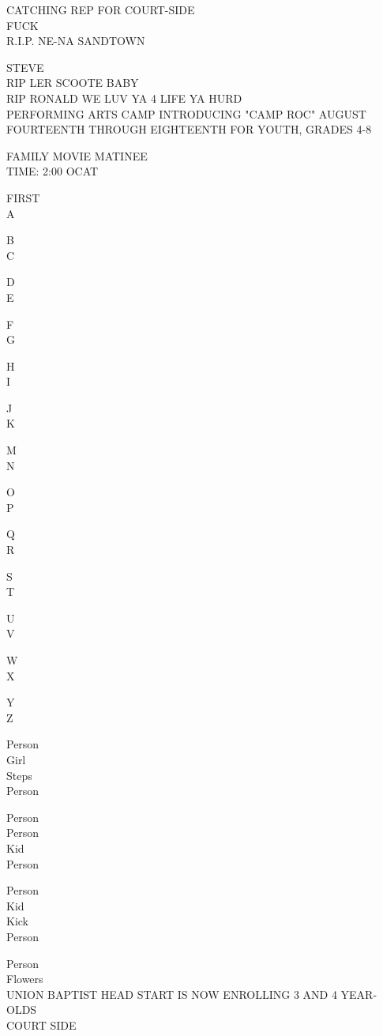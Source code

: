 \documentclass[10pt,letterpaper]{article}
\begin{document}
CATCHING REP FOR COURT{-}SIDE\\
FUCK\\
R.I.P. NE{-}NA SANDTOWN

STEVE\\
RIP LER SCOOTE BABY\\
RIP RONALD WE LUV YA 4 LIFE YA HURD\\
PERFORMING ARTS CAMP INTRODUCING "CAMP ROC" AUGUST FOURTEENTH THROUGH EIGHTEENTH FOR YOUTH, GRADES 4{-}8

FAMILY MOVIE MATINEE\\
TIME: 2:00 OCAT

FIRST\\
A

B\\
C

D\\
E

F\\
G

H\\
I

J\\
K

M\\
N

O\\
P

Q\\
R

S\\
T

U\\
V

W\\
X

Y\\
Z

Person\\
Girl\\
Steps\\
Person

Person\\
Person\\
Kid\\
Person

Person\\
Kid\\
Kick\\
Person

Person\\
Flowers\\
UNION BAPTIST HEAD START IS NOW ENROLLING 3 AND 4 YEAR{-}OLDS\\
COURT SIDE
\end{document}
